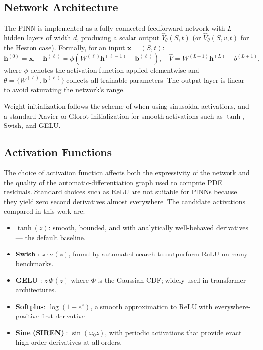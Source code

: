\subsection{Network Architecture}\label{subsection:architecture}

The PINN is implemented as a fully connected feedforward network with $L$ hidden layers of width $d$, producing a scalar output $\hat{V}_\theta(S,t)$ (or $\hat{V}_\theta(S,v,t)$ for the Heston case). Formally, for an input $\mathbf{x} = (S,t)$:
\[
\mathbf{h}^{(0)} = \mathbf{x},
\quad
\mathbf{h}^{(\ell)} = \phi\!\left(W^{(\ell)}\mathbf{h}^{(\ell-1)} + \mathbf{b}^{(\ell)}\right),
\quad
\hat{V} = W^{(L+1)}\mathbf{h}^{(L)} + b^{(L+1)},
\]
where $\phi$ denotes the activation function applied elementwise and $\theta = \{W^{(\ell)},\mathbf{b}^{(\ell)}\}$ collects all trainable parameters. The output layer is linear to avoid saturating the network's range.

Weight initialization follows the scheme of \textcite{sitzmann2020siren} when using sinusoidal activations, and a standard Xavier or Glorot initialization \parencite{goodfellow2016deep} for smooth activations such as $\tanh$, Swish, and GELU.

\subsection{Activation Functions}\label{subsection:activation}

The choice of activation function affects both the expressivity of the network and the quality of the automatic-differentiation graph used to compute PDE residuals. Standard choices such as ReLU are not suitable for PINNs because they yield zero second derivatives almost everywhere. The candidate activations compared in this work are:

\begin{itemize}
  \item $\tanh(z)$: smooth, bounded, and with analytically well-behaved derivatives — the default baseline.
  \item \textbf{Swish} \parencite{ramachandran2017swish}: $z\cdot\sigma(z)$, found by automated search to outperform ReLU on many benchmarks.
  \item \textbf{GELU} \parencite{hendrycks2016gelu}: $z\,\Phi(z)$ where $\Phi$ is the Gaussian CDF; widely used in transformer architectures.
  \item \textbf{Softplus}: $\log(1+e^z)$, a smooth approximation to ReLU with everywhere-positive first derivative.
  \item \textbf{Sine (SIREN)} \parencite{sitzmann2020siren}: $\sin(\omega_0 z)$, with periodic activations that provide exact high-order derivatives at all orders.
\end{itemize}


